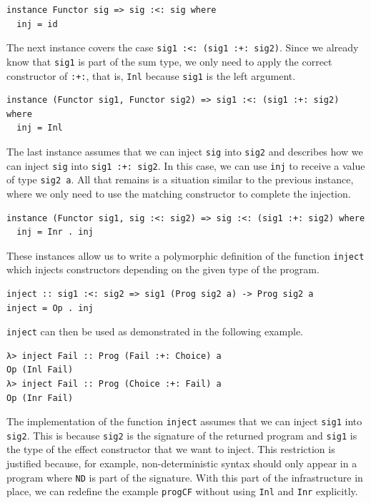\documentclass[a4paper, 11pt, fleqn, twoside]{scrreprt}
\newcommand{\hinl}[1]{\texttt{#1}}
\begin{document}
\begin{verbatim}
instance Functor sig => sig :<: sig where
  inj = id  
\end{verbatim}

The next instance covers the case \hinl{sig1 :<: (sig1 :+: sig2)}.
Since we already know that \hinl{sig1} is part of the sum type, we only need to apply the correct constructor of \hinl{:+:}, that is, \hinl{Inl} because \hinl{sig1} is the left argument.

\begin{verbatim}
instance (Functor sig1, Functor sig2) => sig1 :<: (sig1 :+: sig2) where
  inj = Inl
\end{verbatim}

The last instance assumes that we can inject \hinl{sig} into \hinl{sig2} and describes how we can inject \hinl{sig} into \hinl{sig1 :+: sig2}.
In this case, we can use \hinl{inj} to receive a value of type \hinl{sig2 a}.
All that remains is a situation similar to the previous instance, where we only need to use the matching constructor to complete the injection.
 
\begin{verbatim}
instance (Functor sig1, sig :<: sig2) => sig :<: (sig1 :+: sig2) where
  inj = Inr . inj
\end{verbatim}

These instances allow us to write a polymorphic definition of the function \hinl{inject} which injects constructors depending on the given type of the program.

\begin{verbatim}
inject :: sig1 :<: sig2 => sig1 (Prog sig2 a) -> Prog sig2 a
inject = Op . inj
\end{verbatim}

\hinl{inject} can then be used as demonstrated in the following example.

\begin{verbatim}
λ> inject Fail :: Prog (Fail :+: Choice) a
Op (Inl Fail)
λ> inject Fail :: Prog (Choice :+: Fail) a
Op (Inr Fail)
\end{verbatim}

The implementation of the function \hinl{inject} assumes that we can inject \hinl{sig1} into \hinl{sig2}.
This is because \hinl{sig2} is the signature of the returned program and \hinl{sig1} is the type of the effect constructor that we want to inject.
This restriction is justified because, for example, non-deterministic syntax should only appear in a program where \hinl{ND} is part of the signature.
With this part of the infrastructure in place, we can redefine the example \hinl{progCF} without using \hinl{Inl} and \hinl{Inr} explicitly.
\end{document}
